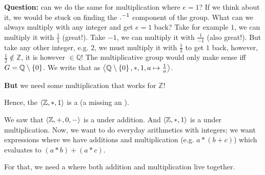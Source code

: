 \textbf{Question: }can we do the same for multiplication where $e = 1$? If we think about it, we would be stuck on finding the ${.}^{-1}$ component of the group. What can we always multiply with any integer and get $e=1$ back? Take for example $1$, we can multiply it with $\frac{1}{1}$ (great!). Take $-1$, we can multiply it with $\frac{1}{-1}$ (also great!). But take any other integer, e.g. $2$, we must multiply it with $\frac{1}{2}$ to get $1$ back, however, $\frac{1}{2} \notin \mathbb{Z}$, it is however $\in \mathbb{Q}$! The multiplicative group would only make sense iff $G = \mathbb{Q} \setminus \left\{0\right\}$. We write that as $\left\langle \mathbb{Q} \setminus \left\{0\right\}, * , 1, a \mapsto \frac{1}{a} \right\rangle$.

\textbf{But }we need some multiplication  that works for $\mathbb{Z}$!


Hence, the  $\left\langle \mathbb{Z}, * , 1 \right\rangle$ is a  (a  missing an ).


We saw that $\left\langle \mathbb{Z}, +, 0, - \right\rangle$ is a  under addition. And $\left\langle \mathbb{Z}, *, 1 \right\rangle$ is a  under multiplication. Now, we want to do everyday arithmetics with integers; we want expressions where we have additions and multiplication (e.g. $a * (b + c)$) which evaluates to $(a * b) + (a * c)$.

For that, we need a  where both addition and multiplication live together.



